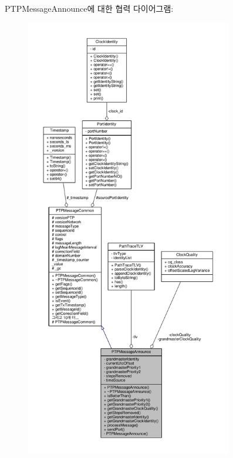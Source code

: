 P\+T\+P\+Message\+Announce에 대한 협력 다이어그램\+:
\nopagebreak
\begin{figure}[H]
\begin{center}
\leavevmode
\includegraphics[height=550pt]{class_p_t_p_message_announce__coll__graph}
\end{center}
\end{figure}
